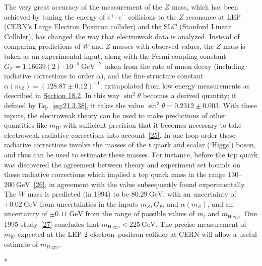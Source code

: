 The very great accuracy of the measurement of the $Z$ mass, which has been achieved by tuning the energy of $e^+$--$e^-$ collisions to the $Z$ resonance at LEP (CERN's Large Electron Positron collider) and the SLC (Stanford Linear Collider), has changed the way that electroweak data is analyzed. Instead of comparing predictions of $W$ and $Z$ masses with observed values, the $Z$ mass is taken as an experimental input, along with the Fermi coupling constant $G_F=1.16639(2)\cdot10^{-5}\ \mathrm{GeV}^{-2}$ taken from the rate of muon decay (including radiative corrections to order $\alpha$), and the fine structure constant $\alpha(m_Z)=(128.87\mathbin{\pm}0.12)^{-1}$, extrapolated from low energy measurements as described in \hyperref[sec:18.2]{Section 18.2}. In this way $\sin^2\theta$ becomes a derived quantity; if defined by Eq.~\eqref{eq:21.3.38}, it takes the value $\sin^2\theta=0.2312\mathbin{\pm}0.003$. With these inputs, the electroweak theory can be used to make predictions of other quantities like $m_W$ with sufficient precision that it becomes necessary to take electroweak radiative corrections into account~\hyperref[ch21-ref-25]{[25]}. In one-loop order these radiative corrections involve the masses of the $t$ quark and scalar (`Higgs') boson, and thus can be used to estimate these masses. For instance, before the top quark was discovered the agreement between theory and experiment set bounds on these radiative corrections which implied a top quark mass in the range $130$--$200\ \mathrm{GeV}$~\hyperref[ch21-ref-26]{[26]}, in agreement with the value subsequently found experimentally. The $W$ mass is predicted (in 1994) to be $80.29\ \mathrm{GeV}$, with an uncertainty of $\mathbin{\pm}0.02\ \mathrm{GeV}$ from uncertainties in the inputs $m_Z,G_F$, and $\alpha(m_Z)$, and an uncertainty of $\mathbin{\pm}0.11\ \mathrm{GeV}$ from the range of possible values of $m_t$ and $m_{\mathrm{Higgs}}$. One 1995 study~\hyperref[ch21-ref-27]{[27]} concludes that $m_{\mathrm{Higgs}}<225\ \mathrm{GeV}$. The precise measurement of $m_W$ expected at the LEP 2 electron--positron collider at CERN will allow a useful estimate of $m_{\mathrm{Higgs}}$.

\begin{center}
* \quad * \quad *
\end{center}

